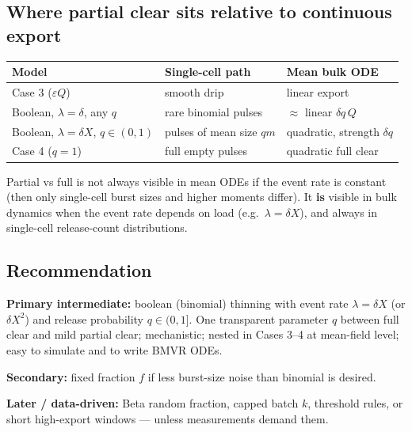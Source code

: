 \documentclass[11pt,a4paper]{article}
\theoremstyle{plain}
\theoremstyle{definition}
\theoremstyle{remark}
\begin{document}
\subsection{Where partial clear sits relative to continuous export}

\begin{center}
\renewcommand{\arraystretch}{1.2}
\begin{tabular}{@{}lll@{}}
\toprule
Model & Single-cell path & Mean bulk ODE \\
\midrule
Case 3 ($\varepsilon Q$) & smooth drip & linear export \\
Boolean, $\lambda=\delta$, any $q$ & rare binomial pulses & $\approx$ linear $\delta q\,Q$ \\
Boolean, $\lambda=\delta X$, $q\in(0,1)$ & pulses of mean size $qm$ & quadratic, strength $\delta q$ \\
Case 4 ($q=1$) & full empty pulses & quadratic full clear \\
\bottomrule
\end{tabular}
\end{center}

Partial vs full is not always visible in mean ODEs if the event rate is
constant (then only single-cell burst sizes and higher moments differ). It
\textbf{is} visible in bulk dynamics when the event rate depends on load
(e.g.\ $\lambda=\delta X$), and always in single-cell release-count
distributions.

\subsection{Recommendation}

\textbf{Primary intermediate:} boolean (binomial) thinning with event rate
$\lambda=\delta X$ (or $\delta X^2$) and release probability $q\in(0,1]$.
One transparent parameter $q$ between full clear and mild partial clear;
mechanistic; nested in Cases 3--4 at mean-field level; easy to simulate and to
write BMVR ODEs.

\textbf{Secondary:} fixed fraction $f$ if less burst-size noise than binomial is
desired.

\textbf{Later / data-driven:} Beta random fraction, capped batch $k$, threshold
rules, or short high-export windows --- unless measurements demand them.
\end{document}

